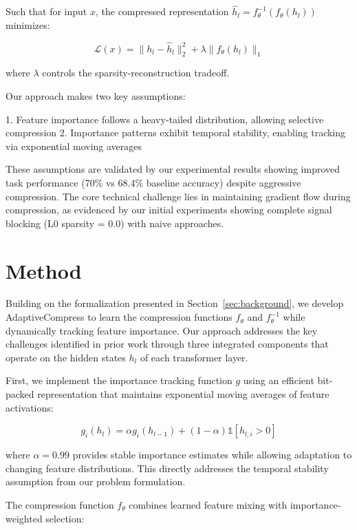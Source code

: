 \documentclass{article} %
\begin{document}
Such that for input $x$, the compressed representation $\hat{h}_l = f^{-1}_\theta(f_\theta(h_l))$ minimizes:

\begin{equation}
\mathcal{L}(x) = \|h_l - \hat{h}_l\|_2^2 + \lambda\|f_\theta(h_l)\|_1
\end{equation}

where $\lambda$ controls the sparsity-reconstruction tradeoff.

Our approach makes two key assumptions:

1. Feature importance follows a heavy-tailed distribution, allowing selective compression
2. Importance patterns exhibit temporal stability, enabling tracking via exponential moving averages

These assumptions are validated by our experimental results showing improved task performance (70\% vs 68.4\% baseline accuracy) despite aggressive compression. The core technical challenge lies in maintaining gradient flow during compression, as evidenced by our initial experiments showing complete signal blocking (L0 sparsity = 0.0) with naive approaches.

\section{Method}
\label{sec:method}

Building on the formalization presented in Section~\ref{sec:background}, we develop AdaptiveCompress to learn the compression functions $f_\theta$ and $f^{-1}_\theta$ while dynamically tracking feature importance. Our approach addresses the key challenges identified in prior work through three integrated components that operate on the hidden states $h_l$ of each transformer layer.

First, we implement the importance tracking function $g$ using an efficient bit-packed representation that maintains exponential moving averages of feature activations:

\begin{equation}
    g_i(h_l) = \alpha g_i(h_{l-1}) + (1-\alpha)\mathbb{1}[h_{l,i} > 0]
\end{equation}

where $\alpha=0.99$ provides stable importance estimates while allowing adaptation to changing feature distributions. This directly addresses the temporal stability assumption from our problem formulation.

The compression function $f_\theta$ combines learned feature mixing with importance-weighted selection:
\end{document}
